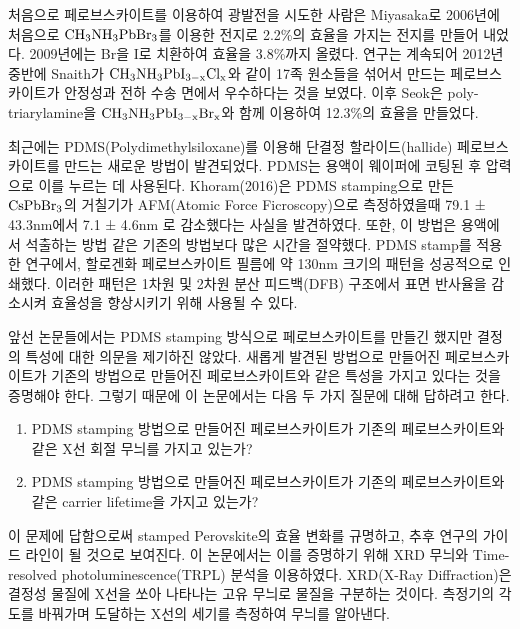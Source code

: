처음으로 페로브스카이트를 이용하여 광발전을 시도한 사람은 Miyasaka로 2006년에 처음으로 $\rm{CH_3NH_3PbBr_3}$를 이용한 전지로 2.2\%의 효율을 가지는 전지를 만들어 내었다\cite{kojima2006novel}. 2009년에는 Br을 I로 치환하여 효율을 3.8\%까지 올렸다\cite{kojima2009organometal}. 연구는 계속되어 2012년 중반에 Snaith가  $\rm{CH_{3}NH_3PbI_{3-x}Cl_x}$와 같이 17족 원소들을 섞어서 만드는 페로브스카이트가 안정성과 전하 수송 면에서 우수하다는 것을 보였다\cite{lee2012efficient}. 이후 Seok은 poly-triarylamine을 $\rm{CH_{3}NH_3PbI_{3-x}Br_x}$와 함께 이용하여 12.3\%의 효율을 만들었다\cite{noh2013chemical}.

최근에는 PDMS(Polydimethylsiloxane)를 이용해 단결정 할라이드(hallide) 페로브스카이트를 만드는 새로운 방법이 발견되었다. PDMS는 용액이 웨이퍼에 코팅된 후 압력으로 이를 누르는 데 사용된다. Khoram(2016)은 PDMS stamping으로 만든 $\rm{CsPbBr_3}$의 거칠기가  AFM(Atomic Force Ficroscopy)으로 측정하였을때 79.1 ± 43.3nm에서 7.1 ± 4.6nm 로 감소했다는 사실을 발견하였다\cite{khoram2016growth}. 또한, 이 방법은 용액에서 석출하는 방법 같은 기존의 방법보다 많은 시간을 절약했다. PDMS stamp를 적용한 연구에서, 할로겐화 페로브스카이트 필름에 약 130nm 크기의 패턴을 성공적으로 인쇄했다\cite{brittman2017controlling}. 이러한 패턴은 1차원 및 2차원 분산 피드백(DFB) 구조에서 표면 반사율을 감소시켜 효율성을 향상시키기 위해 사용될 수 있다.

앞선 논문들에서는 PDMS stamping 방식으로 페로브스카이트를 만들긴 했지만 결정의 특성에 대한 의문을 제기하진 않았다. 새롭게 발견된 방법으로 만들어진 페로브스카이트가 기존의 방법으로 만들어진 페로브스카이트와 같은 특성을 가지고 있다는 것을 증명해야 한다. 그렇기 때문에 이 논문에서는 다음 두 가지 질문에 대해 답하려고 한다.

\begin{enumerate}
	\item PDMS stamping 방법으로 만들어진 페로브스카이트가 기존의 페로브스카이트와 같은 X선 회절 무늬를 가지고 있는가?
	\item PDMS stamping 방법으로 만들어진 페로브스카이트가 기존의 페로브스카이트와 같은 carrier lifetime을 가지고 있는가?
\end{enumerate}

이 문제에 답함으로써 stamped Perovskite의 효율 변화를 규명하고, 추후 연구의 가이드 라인이 될 것으로 보여진다. 이 논문에서는 이를 증명하기 위해 XRD 무늬와 Time-resolved photoluminescence(TRPL) 분석을 이용하였다.
XRD(X-Ray Diffraction)은 결정성 물질에 X선을 쏘아 나타나는 고유 무늬로 물질을 구분하는 것이다. 측정기의 각도를 바꿔가며 도달하는 X선의 세기를 측정하여 무늬를 알아낸다. 

